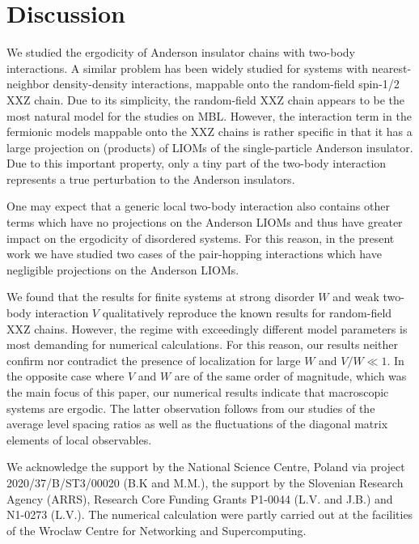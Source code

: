 \documentclass[twocolumn,pre,superscriptaddress,10pt,aps,floatfix]{revtex4-1}
\begin{document}
\section{Discussion} \label{sec:discussion}

We studied the ergodicity of Anderson insulator chains with two-body interactions. A similar problem has been widely studied for systems with nearest-neighbor density-density interactions, mappable onto the random-field spin-1/2 XXZ chain. Due to its simplicity, the random-field XXZ chain appears to be the most natural model for the studies on MBL. However, the interaction term in the fermionic models mappable onto the XXZ chains is rather specific in that it has a large projection on (products) of LIOMs of the single-particle Anderson insulator. Due to this important property, 
only a tiny part of the two-body interaction represents a true perturbation to the Anderson insulators. 

One may expect that a generic local two-body interaction also contains other terms which have no projections on the Anderson LIOMs and thus have greater impact on the ergodicity of disordered systems. For this reason, in the present work we have studied two cases of the pair-hopping interactions which have negligible projections on the Anderson LIOMs.

We found that the results for finite systems at strong disorder $W$ and weak two-body interaction $V$ qualitatively reproduce the known results for random-field XXZ chains.
However, the regime with exceedingly different model parameters is most demanding for numerical calculations. 
For this reason, our results neither confirm nor contradict the presence of localization for large $W$ and $V/W \ll 1$.   
In the opposite case where $V$ and $W$ are of the same order of magnitude, which was the main focus of this paper, our numerical results indicate that macroscopic systems are ergodic. 
The latter observation follows from our studies of the average level spacing ratios as well as the fluctuations of the diagonal matrix elements of local observables.





\acknowledgements 
We acknowledge the support by the National Science Centre, Poland via project 2020/37/B/ST3/00020 (B.K and M.M.), the support by the Slovenian Research Agency (ARRS), Research Core Funding Grants P1-0044 (L.V. and J.B.) and N1-0273 (L.V.). The numerical calculation were partly carried out at the facilities of
the Wroclaw Centre for Networking and Supercomputing.
 


 
\end{document}

